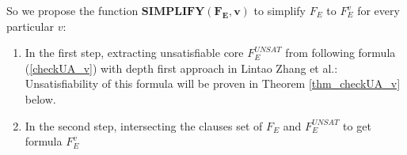 \documentclass[journal]{IEEEtran}
\begin{document}
So we propose the function $\boldsymbol{SIMPLIFY(F_E,v)}$ to simplify $F_E$ to $F_E^v$ for every particular $v$:
\begin{enumerate}
\item In the first step,
extracting unsatisfiable core $F_E^{UNSAT}$ from following formula (\ref{checkUA_v}) with depth first approach in Lintao Zhang et al.\cite{VALIDSAT}:
\begin{equation}\label{checkUA_v}
\end{equation}
Unsatisfiability of this formula will be proven in Theorem \ref{thm_checkUA_v} below.
\item In the second step,
intersecting the clauses set of $F_E$ and $F_E^{UNSAT}$ to get formula $F_E^v$
\begin{equation}\label{checkUA_fev}
\end{equation}
\end{enumerate}
\end{document}
